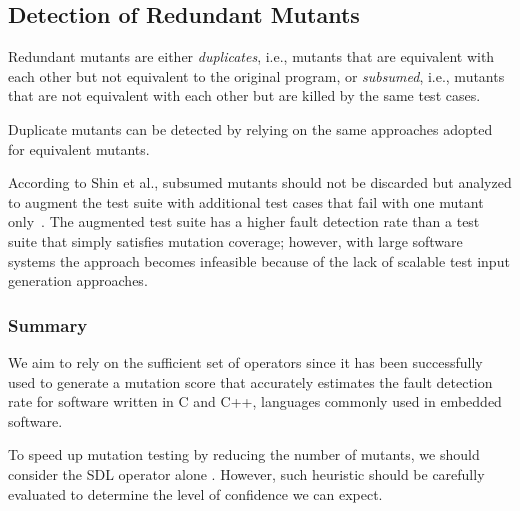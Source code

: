 
\subsection{Detection of Redundant Mutants}
\label{sec:background:redundant}
Redundant mutants are either \emph{duplicates}, i.e., mutants that are equivalent with each other but not equivalent to the original program, or \emph{subsumed}, i.e., mutants that are not equivalent with each other but are killed by the same test cases. 

Duplicate mutants can be detected by relying on the same approaches adopted for equivalent mutants. 

According to Shin et al., subsumed mutants should not be discarded but analyzed to augment the test suite with additional test cases that fail with one mutant only~\cite{Shin:TSE:DCriterion:2018}. 
The augmented test suite has a higher
 fault detection rate than a test suite that simply satisfies mutation coverage; however, with large software systems the approach becomes infeasible because of the lack of scalable test input generation approaches.



\subsubsection{Summary}

We aim to rely on the sufficient set of operators since it has been successfully used to generate a mutation score that accurately estimates the fault detection rate for software written in C and C++, languages commonly used in embedded software.

To speed up mutation testing by reducing the number of mutants, we should consider the SDL operator alone . However, such heuristic should be carefully evaluated to determine the level of confidence we can expect.

